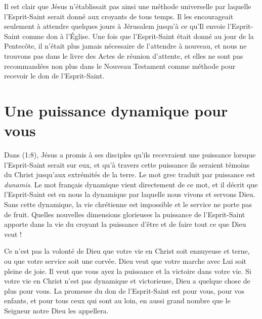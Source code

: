 Il est clair que Jésus n'établissait pas ainsi une méthode universelle par
 laquelle l'Esprit-Saint serait donné aux croyants de tous temps. Il les
 encourageait seulement à attendre quelques jours à Jérusalem jusqu'à ce
 qu'Il envoie l'Esprit-Saint comme don à l'Église. Une fois que
 l'Esprit-Saint était donné au jour de la Pentecôte, il n'était plus
 jamais nécessaire de l'attendre à nouveau, et nous ne trouvons pas dans
 le livre des Actes de réunion d'attente, et elles ne sont pas recommandées
 non plus dans le Nouveau Testament comme méthode pour recevoir le don de
 l'Esprit-Saint.


\section*{Une puissance dynamique pour vous}

Dans (1:8), Jésus a promis à ses disciples
 qu'ils recevraient une puissance lorsque l'Esprit-Saint serait
 sur eux, et qu'à travers cette puissance ils seraient témoins
 du Christ jusqu'aux extrémités de la terre.
 Le mot grec traduit par \og puissance \fg{} est \emph{dunamis}.
 Le mot français \og dynamique \fg{} vient directement de ce mot,
 et il décrit que l'Esprit-Saint est en nous \ocadr la dynamique par laquelle
 nous vivons et servons Dieu. Sans cette dynamique, la vie chrétienne est
 impossible et le service ne porte pas de fruit.
 Quelles nouvelles dimensions glorieuses la puissance de l'Esprit-Saint
 apporte dans la vie du croyant \ocadr la puissance d'être et de faire
 tout ce que Dieu veut !

Ce n'est pas la volonté de Dieu que votre vie en Christ soit ennuyeuse
 et terne, ou que votre service soit une corvée.
 Dieu veut que votre marche avec Lui soit pleine de joie.
 Il veut que vous ayez la puissance et la victoire dans votre vie.
 Si votre vie en Christ n'est pas dynamique et victorieuse,
 Dieu a quelque chose de plus pour vous.
 La promesse du don de l'Esprit-Saint est \og pour vous, pour vos enfants,
 et pour tous ceux qui sont au loin,
 en aussi grand nombre que le Seigneur notre Dieu les appellera. \fg{}

